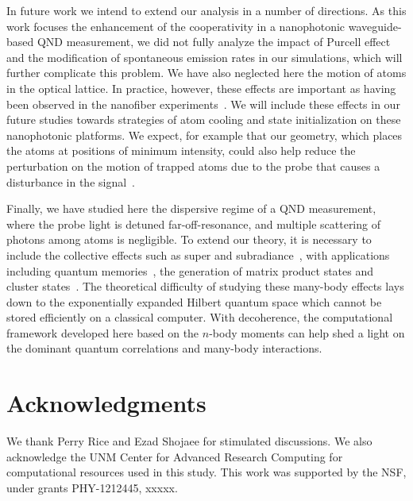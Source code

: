 \documentclass[preprint,aps,pra,onecolumn,superscriptaddress]{revtex4-1} %
\begin{document}
In future work we intend to extend our analysis in a number of directions.  As this work focuses the enhancement of the cooperativity in a nanophotonic waveguide-based QND measurement, we did not fully analyze the impact of Purcell effect and the modification of spontaneous emission rates in our simulations, which will further complicate this problem. We have also neglected here the motion of atoms in the optical lattice. In practice, however, these effects are important as having been observed in the nanofiber  experiments~\cite{Solano2017Dynamics, Solano2017Alignment, Beguin2017Observation, Solano2017Optical}.  We will include these effects in our future studies towards strategies of atom cooling and state initialization on these nanophotonic platforms. We expect, for example that our geometry, which places the atoms at positions of minimum intensity, could also help reduce the perturbation on the motion of trapped atoms due to the probe that causes a disturbance in the signal~\cite{Solano2017Dynamics}.  

Finally, we have studied here the dispersive regime of a QND measurement, where the probe light is detuned far-off-resonance, and multiple scattering  of photons among atoms is negligible. To extend our theory, it is necessary to include the collective effects such as super and subradiance~\cite{Asenjo-Garcia2017Exponential, Asenjo-Garcia2017Atom, Solano2017Super}, with applications including quantum memories~\cite{Sayrin2015, Gouraud2015Demonstration},  the generation of matrix product states and cluster states~\cite{Economou2010, Lodahl2017Chiral, Schwartz2016Deterministic, Pichler2016Photonic, Pichler2017Photonic}.  The theoretical difficulty of studying these many-body effects lays down to the exponentially expanded Hilbert quantum space which cannot be stored efficiently on a classical computer. With decoherence, the computational framework developed here based on the $n$-body moments can help shed a light on the dominant quantum correlations and many-body interactions.

\section{Acknowledgments}
We thank Perry Rice and Ezad Shojaee for stimulated discussions. We also acknowledge the UNM Center for Advanced Research Computing for computational resources used in this study.
This work was supported by the NSF, under grants PHY-1212445, xxxxx.



\end{document}
